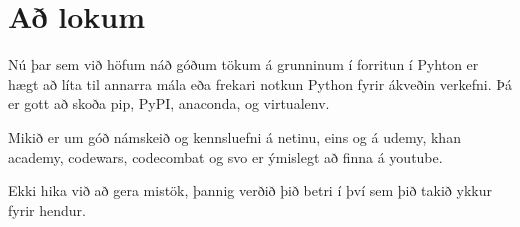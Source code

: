 \section{Að lokum}\label{Að lokum}

Nú þar sem við höfum náð góðum tökum á grunninum í forritun í Pyhton er hægt að líta til annarra mála eða frekari notkun Python fyrir ákveðin verkefni.
Þá er gott að skoða pip, PyPI, anaconda, og virtualenv.

Mikið er um góð námskeið og kennsluefni á netinu, eins og á udemy, khan academy, codewars, codecombat og svo er ýmislegt að finna á youtube.

Ekki hika við að gera mistök, þannig verðið þið betri í því sem þið takið ykkur fyrir hendur. 